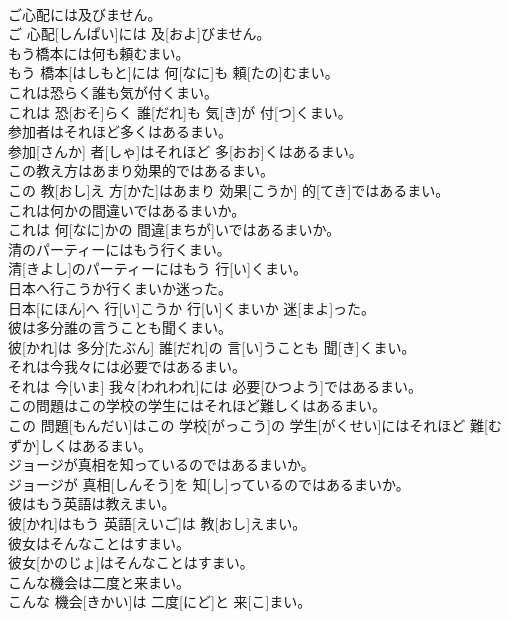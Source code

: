 \documentclass[8pt]{extreport}
\begin{document}
\begin{CJK}{UTF8}{min}
\\	ご心配には及びません。	
\\	ご 心配[しんぱい]には 及[およ]びません。
\\	もう橋本には何も頼むまい。	
\\	もう 橋本[はしもと]には 何[なに]も 頼[たの]むまい。
\\	これは恐らく誰も気が付くまい。	
\\	これは 恐[おそ]らく 誰[だれ]も 気[き]が 付[つ]くまい。
\\	参加者はそれほど多くはあるまい。	
\\	参加[さんか] 者[しゃ]はそれほど 多[おお]くはあるまい。
\\	この教え方はあまり効果的ではあるまい。	
\\	この 教[おし]え 方[かた]はあまり 効果[こうか] 的[てき]ではあるまい。
\\	これは何かの間違いではあるまいか。	
\\	これは 何[なに]かの 間違[まちが]いではあるまいか。
\\	清のパーティーにはもう行くまい。	
\\	清[きよし]のパーティーにはもう 行[い]くまい。
\\	日本へ行こうか行くまいか迷った。	
\\	日本[にほん]へ 行[い]こうか 行[い]くまいか 迷[まよ]った。
\\	彼は多分誰の言うことも聞くまい。	
\\	彼[かれ]は 多分[たぶん] 誰[だれ]の 言[い]うことも 聞[き]くまい。
\\	それは今我々には必要ではあるまい。	
\\	それは 今[いま] 我々[われわれ]には 必要[ひつよう]ではあるまい。
\\	この問題はこの学校の学生にはそれほど難しくはあるまい。	
\\	この 問題[もんだい]はこの 学校[がっこう]の 学生[がくせい]にはそれほど 難[むずか]しくはあるまい。
\\	ジョージが真相を知っているのではあるまいか。	
\\	ジョージが 真相[しんそう]を 知[し]っているのではあるまいか。
\\	彼はもう英語は教えまい。	
\\	彼[かれ]はもう 英語[えいご]は 教[おし]えまい。
\\	彼女はそんなことはすまい。	
\\	彼女[かのじょ]はそんなことはすまい。
\\	こんな機会は二度と来まい。	
\\	こんな 機会[きかい]は 二度[にど]と 来[こ]まい。

\end{CJK}
\end{document}
